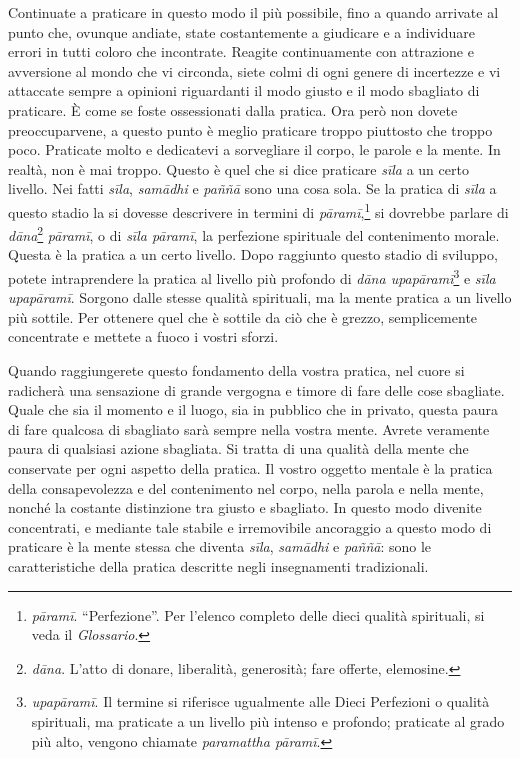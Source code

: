 Continuate a praticare in questo modo il più possibile, fino a quando
arrivate al punto che, ovunque andiate, state costantemente a giudicare
e a individuare errori in tutti coloro che incontrate. Reagite
continuamente con attrazione e avversione al mondo che vi circonda,
siete colmi di ogni genere di incertezze e vi attaccate sempre a
opinioni riguardanti il modo giusto e il modo sbagliato di praticare. È
come se foste ossessionati dalla pratica. Ora però non dovete
preoccuparvene, a questo punto è meglio praticare troppo piuttosto che
troppo poco. Praticate molto e dedicatevi a sorvegliare il corpo, le
parole e la mente. In realtà, non è mai troppo. Questo è quel che si
dice praticare \emph{sīla} a un certo livello. Nei fatti \emph{sīla},
\emph{samādhi} e \emph{paññā} sono una cosa sola. Se la pratica di
\emph{sīla} a questo stadio la si dovesse descrivere in termini di
\emph{pāramī},\footnote{\emph{pāramī}. ``Perfezione''. Per l'elenco
  completo delle dieci qualità spirituali, si veda il \emph{Glossario}.}
si dovrebbe parlare di \emph{dāna}\footnote{\emph{dāna}. L'atto di
  donare, liberalità, generosità; fare offerte, elemosine.}
\emph{pāramī}, o di \emph{sīla pāramī}, la perfezione spirituale del
contenimento morale. Questa è la pratica a un certo livello. Dopo
raggiunto questo stadio di sviluppo, potete intraprendere la pratica al
livello più profondo di \emph{dāna upapāramī}\footnote{\emph{upapāramī}.
  Il termine si riferisce ugualmente alle Dieci Perfezioni o qualità
  spirituali, ma praticate a un livello più intenso e profondo;
  praticate al grado più alto, vengono chiamate \emph{paramattha
  pāramī}.} e \emph{sīla upapāramī}. Sorgono dalle stesse qualità
spirituali, ma la mente pratica a un livello più sottile. Per ottenere
quel che è sottile da ciò che è grezzo, semplicemente concentrate e
mettete a fuoco i vostri sforzi.

Quando raggiungerete questo fondamento della vostra pratica, nel cuore
si radicherà una sensazione di grande vergogna e timore di fare delle
cose sbagliate. Quale che sia il momento e il luogo, sia in pubblico che
in privato, questa paura di fare qualcosa di sbagliato sarà sempre nella
vostra mente. Avrete veramente paura di qualsiasi azione sbagliata. Si
tratta di una qualità della mente che conservate per ogni aspetto della
pratica. Il vostro oggetto mentale è la pratica della consapevolezza e
del contenimento nel corpo, nella parola e nella mente, nonché la
costante distinzione tra giusto e sbagliato. In questo modo divenite
concentrati, e mediante tale stabile e irremovibile ancoraggio a questo
modo di praticare è la mente stessa che diventa \emph{sīla},
\emph{samādhi} e \emph{paññā}: sono le caratteristiche della pratica
descritte negli insegnamenti tradizionali.

